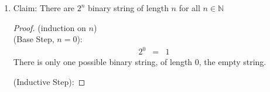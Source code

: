 \documentclass{article}
\begin{document}
\begin{enumerate}
\begin{enumerate}
\begin{proof}
            \hspace{1cm} $k^2-3k = 2c_1$
            \begin{eqnarray}
                (k+1)^2 - 3(k+1) &=& (k+1)(k+1) -3k -3 \\
                &=& k^2 + 2k + 1 - 3k - 3 \\
                &=& (k^2 - 3k) + (2k - 2) \\
                &=& (k^2 - 3k) + 2(k-1) \\
                &=& 2c_1 + 2(k-1) \hspace{1cm} \text{(by the induction hypothesis)} \\
                &=& 2c_1 + 2c_2 \hspace{1cm} \text{(Let $c_2 = k-1$)} \\
                &=& 2(c_1 + c_2) \\
                &=& 2c_3 \hspace{1cm} \text{(Let $c_3 = c_1 + c_2$)} \\
                &&2c_3 \text{ is even} \hspace{1cm} \text{($2n$ is even, where $n \in \mathbb{N}$)} \\
            \end{eqnarray}
            \hspace{1cm} Since $2c_3$ is even, $(k+1)^2 - 3(k+1)$ is even
        \end{proof}
        \item Claim: There are $2^n$ binary string of length $n$ for all $n \in \mathbb{N}$
        \begin{proof}
            (induction on $n$) \\
            (Base Step, $n=0$):
            \begin{eqnarray}
                2^0 &=& 1
            \end{eqnarray}
            \hspace{1cm} There is only one possible binary string, of length $0$, the empty string.

            (Inductive Step):


\end{proof}
\end{enumerate}
\end{enumerate}
\end{document}
